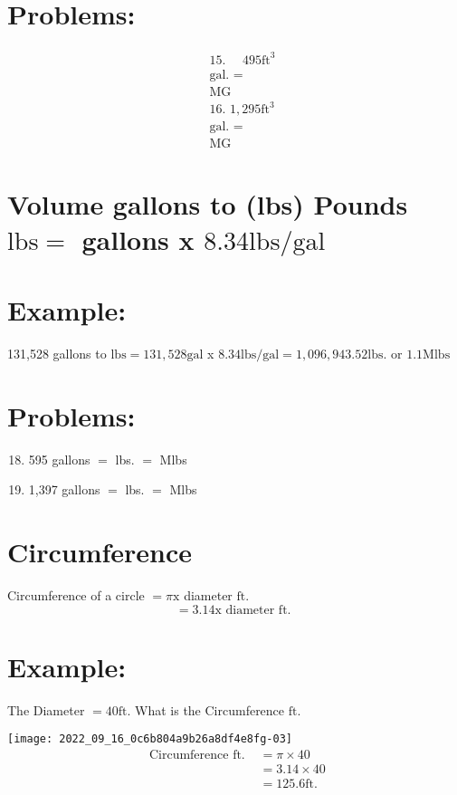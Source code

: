\begin{enumerate}
\section{Problems:}
$$
\begin{aligned}
& \text { 15. } \quad 495 \mathrm{ft}^{3} \\
& \text { gal. = } \\
& \text { MG } \\
& \text { 16. } 1,295 \mathrm{ft}^{3} \\
& \text { gal. = } \\
& \text { MG }
\end{aligned}
$$

\section{Volume gallons to (lbs) Pounds 
 $\mathrm{lbs}=$ gallons x $8.34 \mathrm{lbs} / \mathrm{gal}$}
\section{Example:}
131,528 gallons to $\mathrm{lbs}=131,528 \mathrm{gal}$ x $8.34 \mathrm{lbs} / \mathrm{gal}=1,096,943.52 \mathrm{lbs}$. or $1.1 \mathrm{Mlbs}$

\section{Problems:}
\begin{enumerate}
  \setcounter{enumi}{17}
  \item 595 gallons $=$ lbs. $=$ Mlbs

  \item 1,397 gallons $=$ lbs. $=$ Mlbs

\end{enumerate}
\section{Circumference}
Circumference of a circle $=\pi \mathrm{x}$ diameter $\mathrm{ft}$.
$$
=3.14 \mathrm{x} \text { diameter } \mathrm{ft} \text {. }
$$

\section{Example:}
The Diameter $=40 \mathrm{ft}$. What is the Circumference $\mathrm{ft}$.

\texttt{[image: 2022\_09\_16\_0c6b804a9b26a8df4e8fg-03]}
$$
\begin{aligned}
\text { Circumference ft. } &=\pi \times 40 \\
&=3.14 \times 40 \\
&=125.6 \mathrm{ft} .
\end{aligned}
$$


\end{enumerate}
